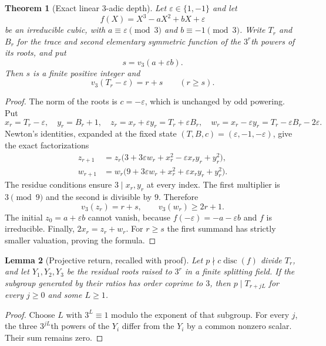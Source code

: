 \documentclass[11pt,a4paper]{article}
\newtheorem{theorem}{Theorem}[section]
\newtheorem{lemma}[theorem]{Lemma}
\theoremstyle{definition}
\theoremstyle{remark}
\numberwithin{equation}{section}
\begin{document}
\begin{theorem}[Exact linear $3$-adic depth]
\label{f13:thm:r2-depth}
Let $\varepsilon\in\{1,-1\}$ and let
\[
 f(X)=X^3-aX^2+bX+\varepsilon
\]
be an irreducible cubic, with
$a\equiv\varepsilon\pmod3$ and $b\equiv-1\pmod3$.
Write $T_r$ and $B_r$ for the trace and second elementary symmetric
function of the $3^r$th powers of its roots, and put
\[
 s=v_3(a+\varepsilon b).
\]
Then $s$ is a finite positive integer and
\[
 \boxed{v_3(T_r-\varepsilon)=r+s\qquad(r\ge s).}
\]
\end{theorem}
\begin{proof}
The norm of the roots is $c=-\varepsilon$, which is unchanged by
odd powering. Put
\[
 x_r=T_r-\varepsilon,\quad y_r=B_r+1,\quad
 z_r=x_r+\varepsilon y_r=T_r+\varepsilon B_r,\quad
 w_r=x_r-\varepsilon y_r=T_r-\varepsilon B_r-2\varepsilon.
\]
Newton's identities, expanded at the fixed state
$(T,B,c)=(\varepsilon,-1,-\varepsilon)$, give the exact factorizations
\[
\begin{split}
 z_{r+1}&=z_r\bigl(3+3\varepsilon w_r
                   +x_r^2-\varepsilon x_ry_r+y_r^2\bigr),\\
 w_{r+1}&=w_r\bigl(9+3\varepsilon w_r
                   +x_r^2+\varepsilon x_ry_r+y_r^2\bigr).
\end{split}
\]
The residue conditions ensure $3\mid x_r,y_r$ at every index.
The first multiplier is $3\pmod9$ and the second is divisible by
$9$. Therefore
\[
 v_3(z_r)=r+s,\qquad v_3(w_r)\ge2r+1.
\]
The initial $z_0=a+\varepsilon b$ cannot vanish, because
$f(-\varepsilon)=-a-\varepsilon b$ and $f$ is irreducible.
Finally, $2x_r=z_r+w_r$. For $r\ge s$ the first summand has
strictly smaller valuation, proving the formula.
\end{proof}

\begin{lemma}[Projective return, recalled with proof]
\label{f13:lem:r2-projective}
Let $p\nmid c\operatorname{disc}(f)$ divide $T_r$, and let
$Y_1,Y_2,Y_3$ be the residual roots raised to $3^r$ in a finite
splitting field. If the subgroup generated by their ratios has
order coprime to $3$, then $p\mid T_{r+jL}$ for every $j\ge0$
and some $L\ge1$.
\end{lemma}
\begin{proof}
Choose $L$ with $3^L\equiv1$ modulo the exponent of that subgroup.
For every $j$, the three $3^{jL}$th powers of the $Y_i$ differ
from the $Y_i$ by a common nonzero scalar. Their sum remains zero.
\end{proof}
\end{document}
